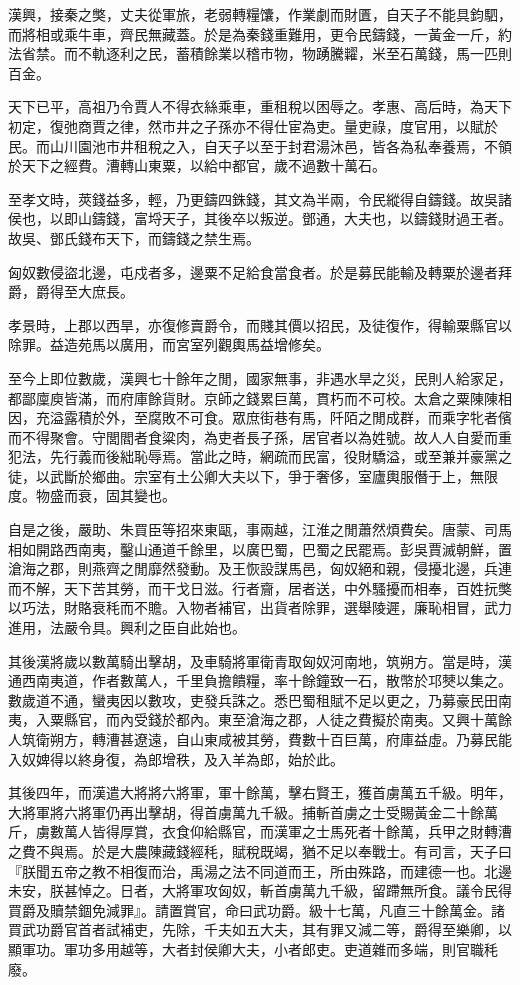漢興，接秦之獘，丈夫從軍旅，老弱轉糧馕，作業劇而財匱，自天子不能具鈞駟，而將相或乘牛車，齊民無藏蓋。於是為秦錢重難用，更令民鑄錢，一黃金一斤，約法省禁。而不軌逐利之民，蓄積餘業以稽市物，物踴騰糶，米至石萬錢，馬一匹則百金。

天下已平，高祖乃令賈人不得衣絲乘車，重租稅以困辱之。孝惠、高后時，為天下初定，復弛商賈之律，然市井之子孫亦不得仕宦為吏。量吏祿，度官用，以賦於民。而山川園池市井租稅之入，自天子以至于封君湯沐邑，皆各為私奉養焉，不領於天下之經費。漕轉山東粟，以給中都官，歲不過數十萬石。

至孝文時，莢錢益多，輕，乃更鑄四銖錢，其文為半兩，令民縱得自鑄錢。故吳諸侯也，以即山鑄錢，富埒天子，其後卒以叛逆。鄧通，大夫也，以鑄錢財過王者。故吳、鄧氏錢布天下，而鑄錢之禁生焉。

匈奴數侵盜北邊，屯戍者多，邊粟不足給食當食者。於是募民能輸及轉粟於邊者拜爵，爵得至大庶長。

孝景時，上郡以西旱，亦復修賣爵令，而賤其價以招民，及徒復作，得輸粟縣官以除罪。益造苑馬以廣用，而宮室列觀輿馬益增修矣。

至今上即位數歲，漢興七十餘年之閒，國家無事，非遇水旱之災，民則人給家足，都鄙廩庾皆滿，而府庫餘貨財。京師之錢累巨萬，貫朽而不可校。太倉之粟陳陳相因，充溢露積於外，至腐敗不可食。眾庶街巷有馬，阡陌之閒成群，而乘字牝者儐而不得聚會。守閭閻者食粱肉，為吏者長子孫，居官者以為姓號。故人人自愛而重犯法，先行義而後絀恥辱焉。當此之時，網疏而民富，役財驕溢，或至兼并豪黨之徒，以武斷於鄉曲。宗室有土公卿大夫以下，爭于奢侈，室廬輿服僭于上，無限度。物盛而衰，固其變也。

自是之後，嚴助、朱買臣等招來東甌，事兩越，江淮之閒蕭然煩費矣。唐蒙、司馬相如開路西南夷，鑿山通道千餘里，以廣巴蜀，巴蜀之民罷焉。彭吳賈滅朝鮮，置滄海之郡，則燕齊之閒靡然發動。及王恢設謀馬邑，匈奴絕和親，侵擾北邊，兵連而不解，天下苦其勞，而干戈日滋。行者齎，居者送，中外騷擾而相奉，百姓抏獘以巧法，財賂衰秏而不贍。入物者補官，出貨者除罪，選舉陵遲，廉恥相冒，武力進用，法嚴令具。興利之臣自此始也。

其後漢將歲以數萬騎出擊胡，及車騎將軍衛青取匈奴河南地，筑朔方。當是時，漢通西南夷道，作者數萬人，千里負擔饋糧，率十餘鐘致一石，散幣於邛僰以集之。數歲道不通，蠻夷因以數攻，吏發兵誅之。悉巴蜀租賦不足以更之，乃募豪民田南夷，入粟縣官，而內受錢於都內。東至滄海之郡，人徒之費擬於南夷。又興十萬餘人筑衛朔方，轉漕甚遼遠，自山東咸被其勞，費數十百巨萬，府庫益虛。乃募民能入奴婢得以終身復，為郎增秩，及入羊為郎，始於此。

其後四年，而漢遣大將將六將軍，軍十餘萬，擊右賢王，獲首虜萬五千級。明年，大將軍將六將軍仍再出擊胡，得首虜萬九千級。捕斬首虜之士受賜黃金二十餘萬斤，虜數萬人皆得厚賞，衣食仰給縣官，而漢軍之士馬死者十餘萬，兵甲之財轉漕之費不與焉。於是大農陳藏錢經秏，賦稅既竭，猶不足以奉戰士。有司言，天子曰『朕聞五帝之教不相復而治，禹湯之法不同道而王，所由殊路，而建德一也。北邊未安，朕甚悼之。日者，大將軍攻匈奴，斬首虜萬九千級，留蹛無所食。議令民得買爵及贖禁錮免減罪』。請置賞官，命曰武功爵。級十七萬，凡直三十餘萬金。諸買武功爵官首者試補吏，先除，千夫如五大夫，其有罪又減二等，爵得至樂卿，以顯軍功。軍功多用越等，大者封侯卿大夫，小者郎吏。吏道雜而多端，則官職秏廢。

